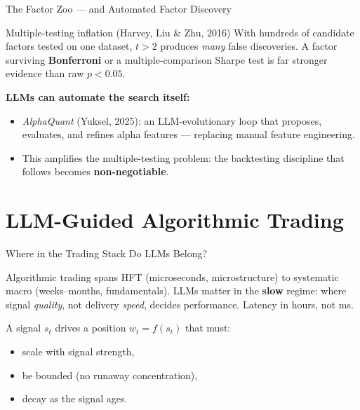 \documentclass[9pt,t]{beamer}
\begin{document}
\begin{frame}{The Factor Zoo --- and Automated Factor Discovery}
\begin{alertblock}{Multiple-testing inflation (Harvey, Liu \& Zhu, 2016)}
With hundreds of candidate factors tested on one dataset, $t>2$ produces \emph{many}
false discoveries. A factor surviving \textbf{Bonferroni} or a multiple-comparison
Sharpe test is far stronger evidence than raw $p<0.05$.
\end{alertblock}

\medskip
\textbf{LLMs can automate the search itself:}
\begin{itemize}
  \item \emph{AlphaQuant} (Yuksel, 2025): an LLM-evolutionary loop that proposes,
        evaluates, and refines alpha features --- replacing manual feature engineering.
  \item This amplifies the multiple-testing problem: the backtesting discipline that
        follows becomes \textbf{non-negotiable}.
\end{itemize}
\end{frame}

\section{LLM-Guided Algorithmic Trading}

\begin{frame}{Where in the Trading Stack Do LLMs Belong?}
\begin{bigpicture}
Algorithmic trading spans HFT (microseconds, microstructure) to systematic macro
(weeks--months, fundamentals). LLMs matter in the \textbf{slow} regime: where signal
\emph{quality}, not delivery \emph{speed}, decides performance. Latency in hours, not ms.
\end{bigpicture}

\medskip
A signal $s_t$ drives a position $w_t=f(s_t)$ that must:
\begin{itemize}
  \item scale with signal strength,
  \item be bounded (no runaway concentration),
  \item decay as the signal ages.
\end{itemize}
\end{frame}
\end{document}
